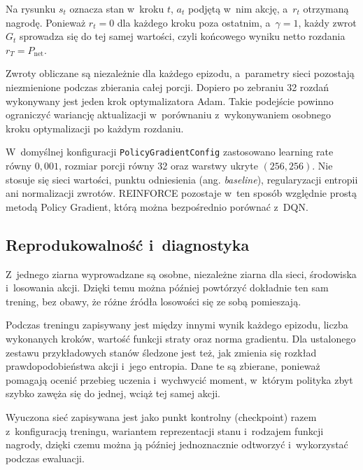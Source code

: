 Na rysunku $s_t$ oznacza stan w~kroku $t$, $a_t$ podjętą w~nim akcję,
a~$r_t$ otrzymaną nagrodę. Ponieważ $r_t=0$ dla każdego kroku poza
ostatnim, a~$\gamma=1$, każdy zwrot $G_t$ sprowadza się do tej samej
wartości, czyli końcowego wyniku netto rozdania $r_T=P_{\mathrm{net}}$.

Zwroty obliczane są niezależnie dla każdego epizodu, a~parametry sieci
pozostają niezmienione podczas zbierania całej porcji. Dopiero po
zebraniu 32 rozdań wykonywany jest jeden krok optymalizatora Adam.
Takie podejście powinno ograniczyć wariancję aktualizacji w~porównaniu
z~wykonywaniem osobnego kroku optymalizacji po każdym rozdaniu.

W~domyślnej konfiguracji \texttt{PolicyGradientConfig} zastosowano
learning rate równy $0{,}001$, rozmiar porcji równy 32 oraz warstwy
ukryte $(256,256)$. Nie stosuje się sieci wartości, punktu odniesienia
(ang. \emph{baseline}), regularyzacji entropii ani normalizacji zwrotów.
REINFORCE pozostaje w~ten sposób względnie prostą metodą Policy Gradient,
którą można bezpośrednio porównać z~DQN.

\subsection{Reprodukowalność i~diagnostyka}

Z~jednego ziarna wyprowadzane są osobne, niezależne ziarna dla sieci,
środowiska i~losowania akcji. Dzięki temu można później powtórzyć
dokładnie ten sam trening, bez obawy, że różne źródła losowości się
ze sobą pomieszają.

Podczas treningu zapisywany jest między innymi wynik każdego epizodu, liczba
wykonanych kroków, wartość funkcji straty oraz norma gradientu. Dla
ustalonego zestawu przykładowych stanów śledzone jest też, jak zmienia się
rozkład prawdopodobieństwa akcji i~jego entropia. Dane te są zbierane, ponieważ pomagają
ocenić przebieg uczenia i~wychwycić moment, w~którym polityka zbyt
szybko zawęża się do jednej, wciąż tej samej akcji.

Wyuczona sieć zapisywana jest jako punkt kontrolny (checkpoint) razem
z~konfiguracją treningu, wariantem reprezentacji stanu i~rodzajem funkcji nagrody,
dzięki czemu można ją później jednoznacznie odtworzyć i~wykorzystać podczas
ewaluacji.
